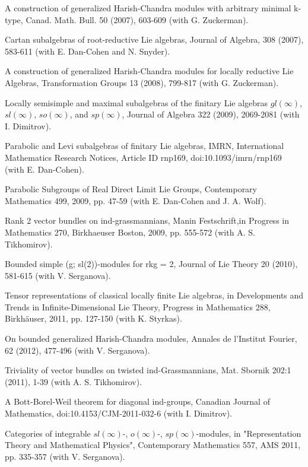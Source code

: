 \documentclass[11pt]{amsart}
\begin{document}
\myss \label{42.} A construction of generalized Harish-Chandra modules with arbitrary minimal k-type, Canad. Math. Bull. 50 (2007), 603-609 (with G. Zuckerman). 

\myss \label{43.} Cartan subalgebras of root-reductive Lie algebras, Journal of Algebra, 308 (2007), 583-611 (with E. Dan-Cohen and N. Snyder).

\myss \label{44.} A construction of generalized Harish-Chandra modules for locally reductive Lie Algebras, Transformation Groups 13 (2008), 799-817 (with G. Zuckerman).

\myss \label{45.} Locally semisimple and maximal subalgebras of the finitary Lie algebras $gl(\infty)$, $sl(\infty)$, $so(\infty)$, and $sp(\infty)$, Journal of Algebra 322 (2009), 2069-2081 (with I. Dimitrov).

\myss \label{46.} Parabolic and Levi subalgebras of finitary Lie algebras, IMRN, International Mathematics Research Notices, Article ID rnp169, doi:10.1093/imrn/rnp169 (with E. Dan-Cohen).

\myss \label{47.} Parabolic Subgroups of Real Direct Limit Lie Groups, Contemporary Mathematics 499, 2009, pp. 47-59 (with E. Dan-Cohen and J. A. Wolf).

\myss \label{48.} Rank 2 vector bundles on ind-grassmannians, Manin Festschrift,in Progress in Mathematics 270, Birkhaeuser Boston, 2009, pp. 555-572 (with A. S. Tikhomirov).

\myss \label{49.} Bounded simple (g; sl(2))-modules for rkg = 2, Journal of Lie Theory 20 (2010), 581-615 (with V. Serganova).

\myss \label{50.} Tensor representations of classical locally finite Lie algebras, in Developments and Trends in Infinite-Dimensional Lie Theory, Progress in Mathematics 288, Birkh\"auser, 2011, pp. 127-150 (with K. Styrkas).

\myss \label{51.} On bounded generalized Harish-Chandra modules, Annales de l'Institut Fourier, 62 (2012), 477-496 (with V. Serganova).

\myss \label{52.} Triviality of vector bundles on twisted ind-Grassmannians, Mat. Sbornik 202:1 (2011), 1-39 (with A. S. Tikhomirov).

\myss \label{53.} A Bott-Borel-Weil theorem for diagonal ind-groups, Canadian Journal of Mathematics, doi:10.4153/CJM-2011-032-6 (with I. Dimitrov).

\myss \label{54.} Categories of integrable $sl(\infty)$-, $o(\infty)$-, $sp(\infty)$-modules, in "Representation Theory and Mathematical Physics", Contemporary Mathematics 557, AMS 2011, pp. 335-357 (with V. Serganova).
\end{document}
